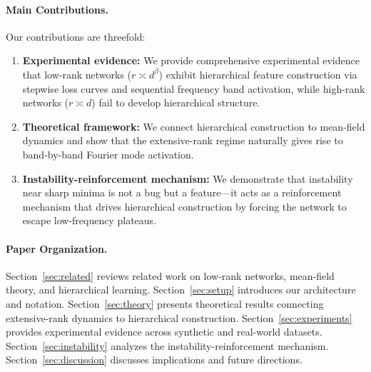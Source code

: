 \paragraph{Main Contributions.}
Our contributions are threefold:
\begin{enumerate}
    \item \textbf{Experimental evidence:} We provide comprehensive experimental evidence that low-rank networks ($r \asymp d^\beta$) exhibit hierarchical feature construction via stepwise loss curves and sequential frequency band activation, while high-rank networks ($r \asymp d$) fail to develop hierarchical structure.
    \item \textbf{Theoretical framework:} We connect hierarchical construction to mean-field dynamics and show that the extensive-rank regime naturally gives rise to band-by-band Fourier mode activation.
    \item \textbf{Instability-reinforcement mechanism:} We demonstrate that instability near sharp minima is not a bug but a feature---it acts as a reinforcement mechanism that drives hierarchical construction by forcing the network to escape low-frequency plateaus.
\end{enumerate}

\paragraph{Paper Organization.}
Section~\ref{sec:related} reviews related work on low-rank networks, mean-field theory, and hierarchical learning. Section~\ref{sec:setup} introduces our architecture and notation. Section~\ref{sec:theory} presents theoretical results connecting extensive-rank dynamics to hierarchical construction. Section~\ref{sec:experiments} provides experimental evidence across synthetic and real-world datasets. Section~\ref{sec:instability} analyzes the instability-reinforcement mechanism. Section~\ref{sec:discussion} discusses implications and future directions.

